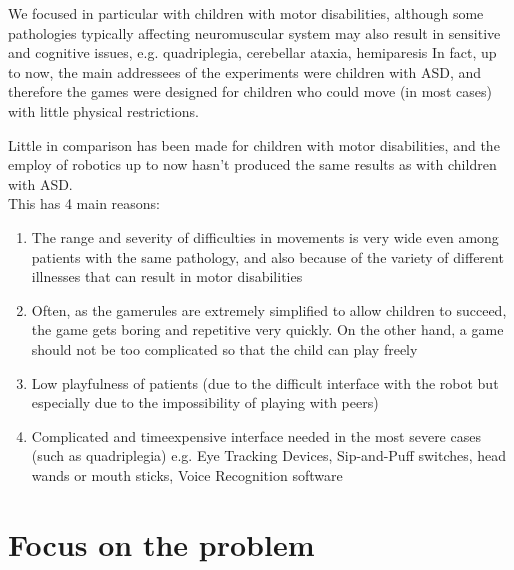 \documentclass[a4paper,twoside]{book}
\begin{document}
We focused in particular with children with motor disabilities, although some pathologies typically affecting neuromuscular system may also result in sensitive and cognitive issues, e.g. quadriplegia, cerebellar ataxia, hemiparesis \textellipsis
In fact, up to now, the main addressees of the experiments were children with ASD, and therefore the games were designed for children who could move (in most cases) with little physical restrictions.

Little in comparison has been made for children with motor disabilities, and the employ of robotics up to now hasn't produced the same results as with children with ASD.
\\
This has 4 main reasons:

\begin{enumerate}
\item The range and severity of difficulties in movements is very wide even among patients with the same pathology, and also because of the variety of different illnesses that can result in motor disabilities
\item Often, as the game\textendash rules are extremely simplified to allow children to succeed, the game gets boring and repetitive very quickly. On the other hand, a game should not be too complicated so that the child can play freely
\item Low playfulness of patients (due to the difficult interface with the robot but especially due to the impossibility of playing with peers)
\item Complicated and time\textendash expensive interface needed in the most severe cases (such as quadriplegia) e.g. Eye Tracking Devices, Sip-and-Puff switches, head wands or mouth sticks, Voice Recognition software \textellipsis
\end{enumerate}

\section{Focus on the problem}
\end{document}
